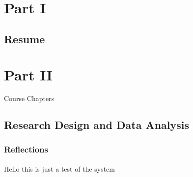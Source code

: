 \documentclass[12pt,titlepage]{article}
\begin{document}
\maketitle
\tableofcontents

\section{Part I}
\subsection{Resume}


\section{Part II}{Course Chapters}
\subsection{Research Design and Data Analysis}
\subsubsection{Reflections}

\paragraph{}
Hello this is just a test of the system






\end{document}
